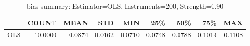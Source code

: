 \begin{table}[ht]
\centering
\caption{bias summary: Estimator=OLS, Instruments=200, Strength=0.90}
\begin{tabular}{lrrrrrrrr}
\toprule
 & COUNT & MEAN & STD & MIN & 25\% & 50\% & 75\% & MAX \\
\midrule
OLS & 10.0000 & 0.0874 & 0.0162 & 0.0710 & 0.0748 & 0.0788 & 0.1019 & 0.1108 \\
\bottomrule
\end{tabular}
\end{table}
